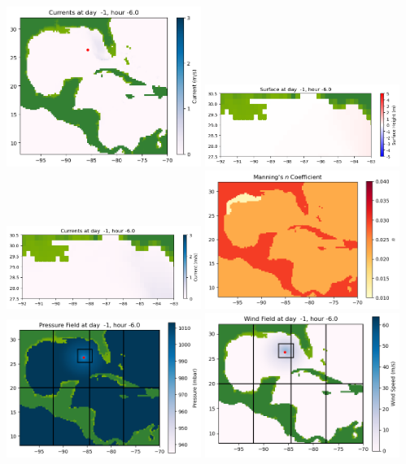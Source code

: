\documentclass[11pt]{article}
\begin{document}
\includegraphics[width=0.475\textwidth]{frame0003fig1002.png}
\vskip 10pt 
\includegraphics[width=0.475\textwidth]{frame0003fig1003.png}
\includegraphics[width=0.475\textwidth]{frame0003fig1004.png}
\vskip 10pt 
\includegraphics[width=0.475\textwidth]{frame0003fig1005.png}
\includegraphics[width=0.475\textwidth]{frame0003fig1006.png}
\vskip 10pt 
\includegraphics[width=0.475\textwidth]{frame0003fig1007.png}
\end{document}
